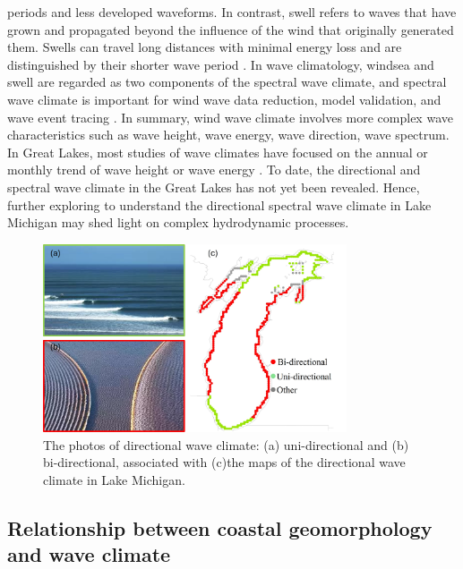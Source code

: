 periods and less developed waveforms. In contrast, swell refers to waves that
have grown and propagated beyond the influence of the wind that originally
generated them. Swells can travel long distances with minimal energy loss and
are distinguished by their shorter wave period \citep{ardhuin_observation_2009}.
In wave climatology, windsea and swell are regarded as two components of the
spectral wave climate, and spectral wave climate is important for wind wave data
reduction, model validation, and wave event tracing
\citep{portilla-yandun_wave_2015}. In summary, wind wave climate involves more
complex wave characteristics such as wave height, wave energy, wave direction,
wave spectrum. In Great Lakes, most studies of wave climates have focused on the
annual or monthly trend of wave height
\citep[\eg][]{olsen_long_2019,huang_impacts_2021,huang_wave_2021} or wave energy
\citep[\eg][]{meadows_relationship_1997}. To date, the directional and spectral
wave climate in the Great Lakes has not yet been revealed. Hence, further
exploring to understand the directional spectral wave climate in Lake Michigan
may shed light on complex hydrodynamic processes.

\begin{figure}[htbp]
  \centering
  \includegraphics[width=0.8\textwidth]{chapter1/resources/figure1-4.jpg}
  \caption{The photos of directional wave climate: (a) uni-directional and (b) bi-directional, associated with (c)the maps of the directional wave climate in Lake Michigan.}
  \label{fig:fig1.4}
\end{figure}

\subsection{Relationship between coastal geomorphology and wave climate}
\label{Relationship between coastal geomorphology and wave climate}

